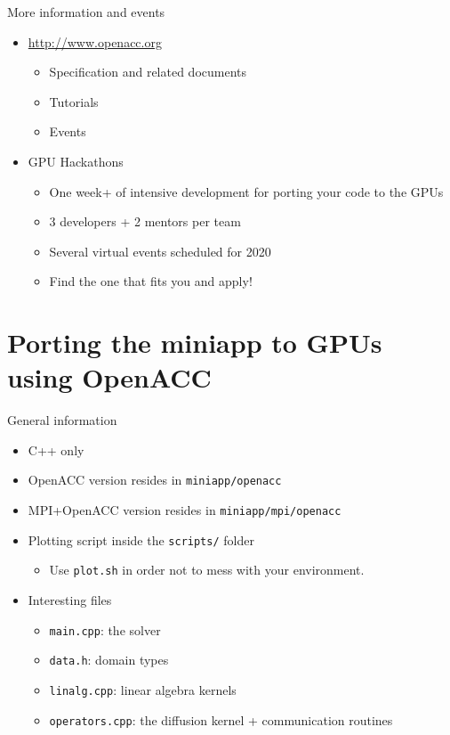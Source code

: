 \documentclass[12pt,aspectratio=169]{beamer}
\newcommand\shinline[2][]{\lstinline[style=shstyle,basicstyle=\ttfamily,#1]!#2!}
\begin{document}
\begin{frame}{More information and events}
  \begin{itemize}
  \item \url{http://www.openacc.org}
    \begin{itemize}
    \item Specification and related documents
    \item Tutorials
    \item Events
    \end{itemize}
    \vfill
  \item GPU Hackathons
    \begin{itemize}
    \item One week+ of intensive development for porting your code to the GPUs
    \item 3 developers + 2 mentors per team
    \item Several virtual events scheduled for 2020
    \item Find the one that fits you and apply!
    \end{itemize}
  \end{itemize}
\end{frame}

\part{Porting the miniapp to GPUs using OpenACC}

\begin{frame}[fragile]{General information}
  \begin{itemize}
  \item C++ only
  \item OpenACC version resides in \shinline{miniapp/openacc}
  \item MPI+OpenACC version resides in \shinline{miniapp/mpi/openacc}
  \item Plotting script inside the \shinline{scripts/} folder
    \begin{itemize}
    \item Use \shinline{plot.sh} in order not to mess with your environment.
    \end{itemize}
  \item Interesting files
    \begin{itemize}
    \item\shinline{main.cpp}: the solver
    \item\shinline{data.h}: domain types
    \item\shinline{linalg.cpp}: linear algebra kernels
    \item\shinline{operators.cpp}: the diffusion kernel + communication routines
    \end{itemize}
  \end{itemize}
\end{frame}
\end{document}

